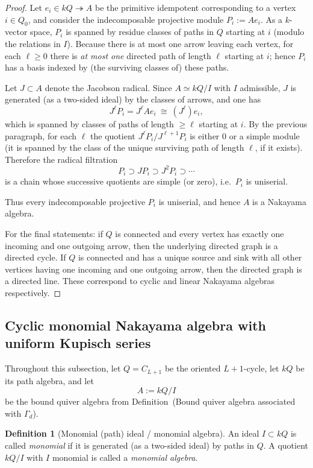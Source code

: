 \documentclass{article}
\theoremstyle{definition}
\newtheorem{definition}[theorem]{Definition}
\begin{document}
\begin{proof}
Let $e_i\in kQ\twoheadrightarrow A$ be the primitive idempotent corresponding to a vertex $i\in Q_0$, and consider the indecomposable projective module $P_i := Ae_i$.
As a $k$-vector space, $P_i$ is spanned by residue classes of paths in $Q$ starting at $i$ (modulo the relations in $I$).
Because there is at most one arrow leaving each vertex, for each $\ell\ge 0$ there is \emph{at most one} directed path of length $\ell$ starting at $i$; hence $P_i$ has a basis indexed by (the surviving classes of) these paths.

Let $J\subset A$ denote the Jacobson radical. Since $A\simeq kQ/I$ with $I$ admissible, $J$ is generated (as a two-sided ideal) by the classes of arrows, and one has
\[
J^\ell P_i = J^\ell Ae_i \ \cong\ (J^\ell)e_i,
\]
which is spanned by classes of paths of length $\ge \ell$ starting at $i$.
By the previous paragraph, for each $\ell$ the quotient $J^\ell P_i/J^{\ell+1}P_i$ is either $0$ or a simple module (it is spanned by the class of the unique surviving path of length $\ell$, if it exists).
Therefore the radical filtration
\[
P_i \supset JP_i \supset J^2P_i \supset \cdots
\]
is a chain whose successive quotients are simple (or zero), i.e.\ $P_i$ is uniserial.

Thus every indecomposable projective $P_i$ is uniserial, and hence $A$ is a Nakayama algebra.

For the final statements: if $Q$ is connected and every vertex has exactly one incoming and one outgoing arrow, then the underlying directed graph is a directed cycle. If $Q$ is connected and has a unique source and sink with all other vertices having one incoming and one outgoing arrow, then the directed graph is a directed line. These correspond to cyclic and linear Nakayama algebras respectively.
\end{proof}
\subsection{Cyclic monomial Nakayama algebra with uniform Kupisch series}
Throughout this subsection, let $Q=C_{L+1}$ be the oriented $L+1$-cycle, let $kQ$ be its path algebra, and let
\[
A:=kQ/I
\]
be the bound quiver algebra from Definition~(Bound quiver algebra associated with $\Gamma_d$).

\begin{definition}[Monomial (path) ideal / monomial algebra]
An ideal $I\subset kQ$ is called \emph{monomial} if it is generated (as a two-sided ideal) by paths in $Q$.
A quotient $kQ/I$ with $I$ monomial is called a \emph{monomial algebra}.
\end{definition}
\end{document}
